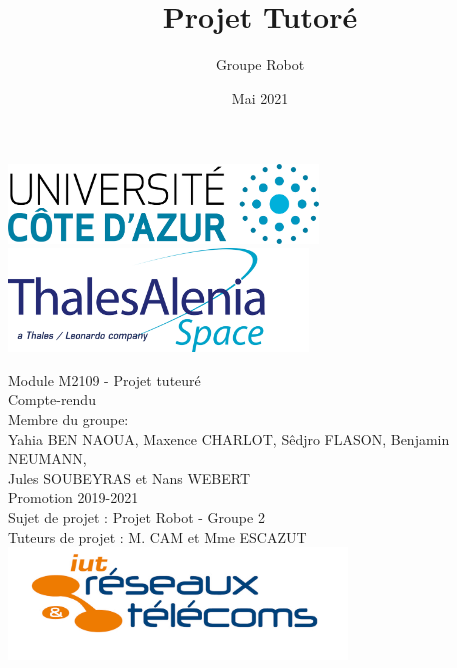 \documentclass{PackagerQualityN}
\title{Projet Tutoré}
\author{Groupe Robot}
\date{Mai 2021}
\begin{document}
\begin{titlepage}%


\includegraphics[height=2.1cm]{./img/uca2.png}
\hfill
\includegraphics[height=2.75cm]{./img/logoThales.png}


\begin{center}
\Huge
Module M2109 - Projet tuteuré\\
Compte-rendu
\\
\vspace{1cm}
\vspace{1cm}
\large
Membre du groupe:\\
Yahia BEN NAOUA, Maxence CHARLOT, Sêdjro FLASON, Benjamin NEUMANN,\\ Jules SOUBEYRAS et Nans WEBERT\\
\vspace{0.2cm}
Promotion 2019-2021\\
\vspace{1cm}
Sujet de projet : Projet Robot - Groupe 2\\
Tuteurs de projet : M. CAM et Mme ESCAZUT\\
\vspace{1cm}
\includegraphics[height=3cm]{img/logoRetT.png}

\end{center}


\end{titlepage}

\end{document}
